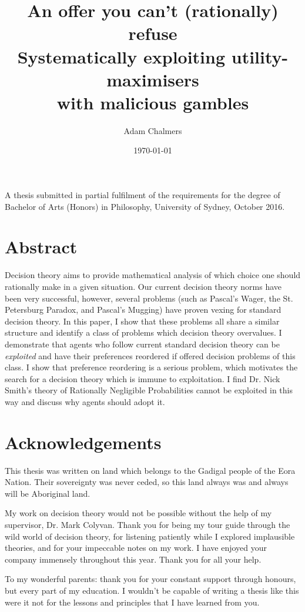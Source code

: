 \documentclass{article}
\title{%
  An offer you can't (rationally) refuse \\
  \large Systematically exploiting utility-maximisers \\
    with malicious gambles}
\author{Adam Chalmers}
\date{\today}
\begin{document}
\frenchspacing
\doublespacing
\maketitle

\noindent
A thesis submitted in partial fulfilment of the requirements for the degree of Bachelor of Arts (Honors) in Philosophy, University of Sydney, October 2016.

\section*{Abstract}

Decision theory aims to provide mathematical analysis of which choice one should rationally make in a given situation. Our current decision theory norms have been very successful, however, several problems (such as Pascal's Wager, the St. Petersburg Paradox, and Pascal's Mugging) have proven vexing for standard decision theory. In this paper, I show that these problems all share a similar structure and identify a class of problems which decision theory overvalues. I demonstrate that agents who follow current standard decision theory can be \textit{exploited} and have their preferences reordered if offered decision problems of this class. I show that preference reordering is a serious problem, which motivates the search for a decision theory which is immune to exploitation. I find Dr. Nick Smith's theory of Rationally Negligible Probabilities cannot be exploited in this way and discuss why agents should adopt it.

\newpage
\section*{Acknowledgements}

This thesis was written on land which belongs to the Gadigal people of the Eora Nation. Their sovereignty was never ceded, so this land always was and always will be Aboriginal land. 

My work on decision theory would not be possible without the help of my supervisor, Dr. Mark Colyvan. Thank you for being my tour guide through the wild world of decision theory, for listening patiently while I explored implausible theories, and for your impeccable notes on my work. I have enjoyed your company immensely throughout this year. Thank you for all your help.

To my wonderful parents: thank you for your constant support through honours, but every part of my education. I wouldn't be capable of writing a thesis like this were it not for the lessons and principles that I have learned from you.
\end{document}
